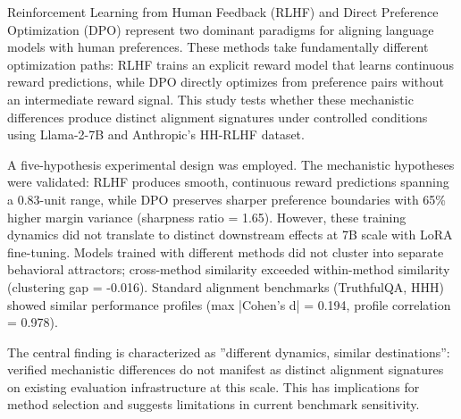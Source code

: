 
Reinforcement Learning from Human Feedback (RLHF) and Direct Preference Optimization (DPO) represent two dominant paradigms for aligning language models with human preferences. These methods take fundamentally different optimization paths: RLHF trains an explicit reward model that learns continuous reward predictions, while DPO directly optimizes from preference pairs without an intermediate reward signal. This study tests whether these mechanistic differences produce distinct alignment signatures under controlled conditions using Llama-2-7B and Anthropic's HH-RLHF dataset.

A five-hypothesis experimental design was employed. The mechanistic hypotheses were validated: RLHF produces smooth, continuous reward predictions spanning a 0.83-unit range, while DPO preserves sharper preference boundaries with 65\% higher margin variance (sharpness ratio = 1.65). However, these training dynamics did not translate to distinct downstream effects at 7B scale with LoRA fine-tuning. Models trained with different methods did not cluster into separate behavioral attractors; cross-method similarity exceeded within-method similarity (clustering gap = -0.016). Standard alignment benchmarks (TruthfulQA, HHH) showed similar performance profiles (max |Cohen's d| = 0.194, profile correlation = 0.978).

The central finding is characterized as ''different dynamics, similar destinations'': verified mechanistic differences do not manifest as distinct alignment signatures on existing evaluation infrastructure at this scale. This has implications for method selection and suggests limitations in current benchmark sensitivity.

